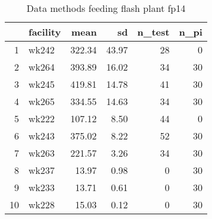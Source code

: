 \begin{table}[H]
\centering
\begin{tabular}{rlrrrr}
  \hline
 & facility & mean & sd & n\_test & n\_pi \\ 
  \hline
1 & wk242 & 322.34 & 43.97 &  28 &   0 \\ 
  2 & wk264 & 393.89 & 16.02 &  34 &  30 \\ 
  3 & wk245 & 419.81 & 14.78 &  41 &  30 \\ 
  4 & wk265 & 334.55 & 14.63 &  34 &  30 \\ 
  5 & wk222 & 107.12 & 8.50 &  44 &   0 \\ 
  6 & wk243 & 375.02 & 8.22 &  52 &  30 \\ 
  7 & wk263 & 221.57 & 3.26 &  34 &  30 \\ 
  8 & wk237 & 13.97 & 0.98 &   0 &  30 \\ 
  9 & wk233 & 13.71 & 0.61 &   0 &  30 \\ 
  10 & wk228 & 15.03 & 0.12 &   0 &  30 \\ 
   \hline
\end{tabular}
\caption{Data methods feeding flash plant fp14} 
\label{tab:well_summaries_fp14}
\end{table}
